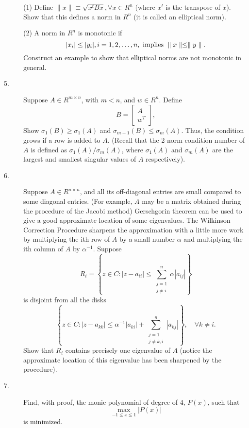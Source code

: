 \documentclass{article}
\begin{document}
\begin{description}
\item[\quad] (1)
Define $\parallel x \parallel \equiv \sqrt{x^t Bx}, \forall x \in R^n$
(where $x^t$ is the transpose of $x$). Show that this defines a norm in $R^n$
(it is called an elliptical norm).

\item[\quad] (2)
A norm in $R^n$ is monotonic if
$$|x_i| \leq |y_i|, i=1,2,\dots, n, \hbox{\ implies\ }
  \parallel x \parallel \leq \parallel y \parallel.$$
Construct an example to show that elliptical norms are not monotonic in
general.

\item[5.]
Suppose $A \in R^{m \times n}$, with $m < n$, and $w \in R^n$. Define
$$B= \begin{bmatrix}
        A \\
        w^T
        \end{bmatrix} , $$
Show $\sigma_1 (B) \geq \sigma_1 (A)$ and $\sigma_{m+1} (B) \leq \sigma_m (A)$.
Thus, the condition grows if a row is added to $A$. (Recall that the 2-norm
condition number of $A$ is defined as $\sigma_1 (A)/ \sigma_m (A)$,
where $\sigma_1 (A)$ and $\sigma_m (A)$ are the largest and smallest
singular values of $A$ respectively).

\item[6.]
Suppose $A \in R^{n \times n}$, and all its off-diagonal entries are small
compared to some diagonal entries. (For example, $A$ may be a matrix obtained
during the procedure of the Jacobi method) Gerschgorin theorem can be used
to give a good approximate location of some eigenvalues. The Wilkinson
Correction Procedure sharpens the approximation with a little more work by
multiplying the ith row of $A$ by a small number $\alpha$ and multiplying
the ith column of $A$ by $\alpha^{-1}$. Suppose
$$R_i = \left\{ z \in C : |z-a_{ii} | \leq \sum^n_{\substack{j=1 \\ j \neq i}}
  \alpha |a_{ij}| \right\}$$
is disjoint from  all the disks
$$\left\{z \in C : |z- a_{kk}| \leq \alpha^{-1} |a_{ki}| +
  \sum^n_{\substack{j=1 \\ j \neq k,i}} |a_{kj}| \right\}, \quad
  \forall k \neq i.$$
Show that $R_i$ contains precisely one eigenvalue of $A$ (notice the
approximate location of this eigenvalue has been sharpened by the procedure).

\item[7.]
Find, with proof, the monic polynomial of degree of 4, $P(x)$, such that
$$\max_{-1 \leq x \leq 1} |P(x)|$$
is minimized.


\end{description}
\end{document}
